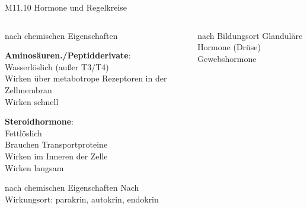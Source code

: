 \documentclass{beamer}
\begin{document}



\begin{frame}{M11.10 Hormone und Regelkreise}


\begin{columns}[c]

\begin{column}{5cm}

\begin{block}{nach chemischen Eigenschaften}

 \textbf{Aminosäuren./Peptidderivate}: \\
 Wasserlöslich (außer T3/T4) \\
 Wirken über metabotrope Rezeptoren in der Zellmembran  \\
 Wirken schnell
 
\textbf{Steroidhormone}: \\
Fettlöslich \\
Brauchen Transportproteine \\
Wirken im Inneren der Zelle \\
Wirken langsam \\


\end{block}

\begin{block}{nach chemischen Eigenschaften}
Nach Wirkungsort: parakrin, autokrin, endokrin
\end{block}



\end{column}


\begin{column}{5cm}

\begin{block}{nach Bildungsort}
Glanduläre Hormone (Drüse) \\
Gewebshormone
\end{block}

\pause


\end{column}
\end{columns}
\end{frame}
\end{document}
